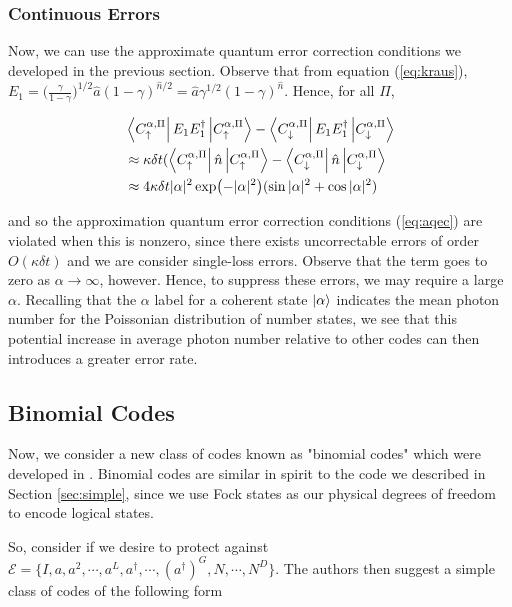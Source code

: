 \documentclass[12]{amsart}
\newcommand\0{\mathbf{0}}
\newcommand\<{\langle}
\renewcommand\>{\rangle}
\begin{document}
\subsubsection{Continuous Errors}

Now, we can use the approximate quantum error correction conditions we developed in the previous section. Observe that from equation (\ref{eq:kraus}), $E_1 = \Big(\frac{\gamma}{1-\gamma}\Big)^{1 / 2} \hat{a} (1 - \gamma)^{\hat{n} / 2} = \hat{a} \gamma^{1/2} (1- \gamma)^{\hat{n}}$. Hence, for all $\Pi$,

\begin{align*}
&\bra{C^{\alpha, \Pi}_{\uparrow}}E_1E_1^\dag\ket{C^{\alpha, \Pi}_{\uparrow}} - \bra{C^{\alpha, \Pi}_{\downarrow}}	E_1E_1^\dag\ket{C^{\alpha, \Pi}_{\downarrow}}	\\
&\approx \kappa\delta t (\bra{C^{\alpha, \Pi}_{\uparrow}}\hat{n}\ket{C^{\alpha, \Pi}_{\uparrow}} - \bra{C^{\alpha, \Pi}_{\downarrow}}	\hat{n}\ket{C^{\alpha, \Pi}_{\downarrow}}\\
&\approx 4 \kappa \delta t |\alpha|^2  \exp(-|\alpha|^2)(\sin |\alpha|^2 + \cos|\alpha|^2)
\end{align*}

and so the approximation quantum error correction conditions (\ref{eq:aqec}) are violated when this is nonzero, since there exists uncorrectable errors of order $O(\kappa \delta t)$ and we are consider single-loss errors. Observe that the term goes to zero as $\alpha\rightarrow \infty$, however. Hence, to suppress these errors, we may require a large $\alpha$. Recalling that the $\alpha$ label for a coherent state $\ket{\alpha}$ indicates the mean photon number for the Poissonian distribution of number states, we see that this potential increase in average photon number relative to other codes can then introduces a greater error rate.

\subsection{Binomial Codes}

Now, we consider a new class of codes known as "binomial codes" which were developed in  \cite{michael2016new}. Binomial codes are similar in spirit to the code we described in Section \ref{sec:simple}, since we use Fock states as our physical degrees of freedom to encode logical states.


So, consider if we desire to protect against $\mathcal{E} = \{I, a, a^2, \cdots, a^L, a^\dag, \cdots, (a^\dag)^G, N, \cdots, N^D \}$. The authors then suggest a simple class of codes of the following form
\end{document}
